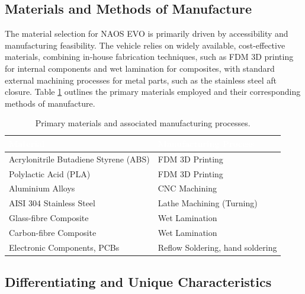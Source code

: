 \documentclass[11pt,a4paper]{article}
\begin{document}
\subsection{Materials and Methods of Manufacture}

The material selection for NAOS EVO is primarily driven by accessibility and manufacturing feasibility. The vehicle relies on widely available, cost-effective materials, combining in-house fabrication techniques, such as FDM 3D printing for internal components and wet lamination for composites, with standard external machining processes for metal parts, such as the stainless steel aft closure. Table \ref{tab:materials_processes} outlines the primary materials employed and their corresponding methods of manufacture.
\begin{table}[H]
    \centering
    \caption{Primary materials and associated manufacturing processes.}
    \label{tab:materials_processes}
    \begin{tabularx}{\textwidth}{|>{\centering\arraybackslash}X|>{\centering\arraybackslash}X|}
        \hline
        \rowcolor{EtseNavy} 
        \textbf{\textcolor{white}{Material}} & \textbf{\textcolor{white}{Manufacturing Process}} \\ \hline
        Acrylonitrile Butadiene Styrene (ABS) & FDM 3D Printing \\ \hline
        \rowcolor{LightGrayTable} 
        Polylactic Acid (PLA) & FDM 3D Printing \\ \hline
        Aluminium Alloys & CNC Machining \\ \hline
        \rowcolor{LightGrayTable} 
        AISI 304 Stainless Steel & Lathe Machining (Turning) \\ \hline
        Glass-fibre Composite & Wet Lamination \\ \hline
        \rowcolor{LightGrayTable} 
        Carbon-fibre Composite & Wet Lamination \\ \hline
        Electronic Components, PCBs & Reflow Soldering, hand soldering \\ \hline
    \end{tabularx}
\end{table}

\subsection{Differentiating and Unique Characteristics}
\end{document}
